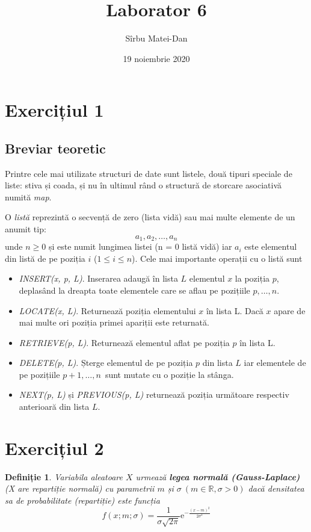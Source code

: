 \documentclass[9pt,a4paper]{article}
\title{\bf Laborator 6}
\author{Sîrbu Matei-Dan}
\date{19 noiembrie 2020}
\newtheorem{definitie}{Definiție}
\begin{document}
\maketitle

\section*{Exercițiul 1}
\subsection*{Breviar teoretic}

\begin{doublespace}
    Printre cele mai utilizate structuri de date sunt listele, două tipuri speciale de liste: stiva și coada, și nu în ultimul rând o structură de storcare asociativă numită \textit{map}.

    O \textit{listă} reprezintă o secvență de zero (lista vidă) sau mai multe elemente de un anumit tip:
    $$a_1, a_2, \dots, a_n$$
    unde $n \geq 0$ și este numit lungimea listei (n = 0 listă vidă) iar $a_i$ este elementul din listă de pe poziția $i$ ($1 \leq i \leq n$). Cele mai importante operații cu o listă sunt

    \begin{itemize}
        \item \textit{INSERT(x, p, L)}. Inserarea adaugă în lista $L$ elementul $x$ la poziția $p$, deplasând la dreapta toate elementele care se aflau pe pozițiile $p, \dots, n$.
        \item \textit{LOCATE(x, L)}. Returnează poziția elementului $x$ în lista L. Dacă $x$ apare de mai multe ori poziția primei apariții este returnată.
        \item \textit{RETRIEVE(p, L)}. Returnează elementul aflat pe poziția $p$ în lista L.
        \item \textit{DELETE(p, L)}. Șterge elementul de pe poziția $p$ din lista $L$ iar elementele de pe pozițiile $p+1, \dots, n$ sunt mutate cu o poziție la stânga.
        \item \textit{NEXT(p, L)} și \textit{PREVIOUS(p, L)} returnează poziția următoare respectiv anterioară din lista $L$.
    \end{itemize}
\end{doublespace}

\newpage

\section*{Exercițiul 2}
\begin{definitie}
    Variabila aleatoare $X$ urmează \textbf{legea normală (Gauss-Laplace)} (X are repartiție normală) cu parametrii $m$ și $\sigma\ (m \in \mathbb{R}, \sigma > 0)$ dacă densitatea sa de probabilitate (repartiție) este funcția
    \begin{equation}
        f(x;m;\sigma) = \frac{1}{\sigma \sqrt{2 \pi}} \mathrm{e}^{-\frac{(x-m)^2}{2\sigma^2}}
        \label{def:gauss}
    \end{equation}
\end{definitie}
\end{document}
